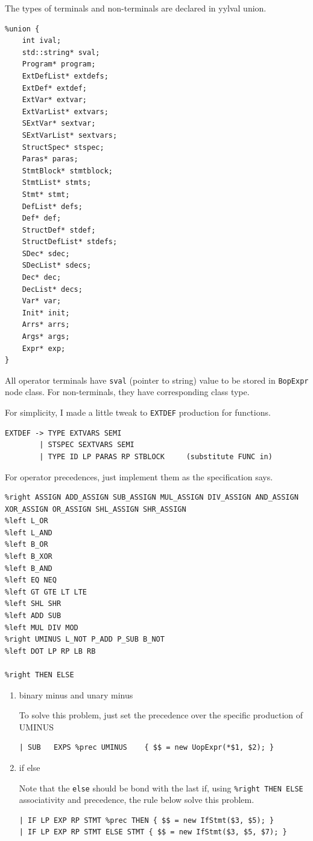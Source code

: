 \documentclass[11pt]{article}
\begin{document}
The types of terminals and non-terminals are declared in yylval union.
\begin{verbatim}
%union {
    int ival;
    std::string* sval;
    Program* program;
    ExtDefList* extdefs;
    ExtDef* extdef;
    ExtVar* extvar;
    ExtVarList* extvars;
    SExtVar* sextvar;
    SExtVarList* sextvars;
    StructSpec* stspec;
    Paras* paras;
    StmtBlock* stmtblock;
    StmtList* stmts;
    Stmt* stmt;
    DefList* defs;
    Def* def;
    StructDef* stdef;
    StructDefList* stdefs;
    SDec* sdec;
    SDecList* sdecs;
    Dec* dec;
    DecList* decs;
    Var* var;
    Init* init;
    Arrs* arrs;
    Args* args;
    Expr* exp;
}
\end{verbatim}

All operator terminals have \texttt{sval} (pointer to string) value to be stored in
\texttt{BopExpr} node class. For non-terminals, they have corresponding class type.

For simplicity, I made a little tweak to \texttt{EXTDEF} production for functions.
\begin{verbatim}
EXTDEF -> TYPE EXTVARS SEMI
        | STSPEC SEXTVARS SEMI
        | TYPE ID LP PARAS RP STBLOCK     (substitute FUNC in)
\end{verbatim}

For operator precedences, just implement them as the specification says.
\begin{verbatim}
%right ASSIGN ADD_ASSIGN SUB_ASSIGN MUL_ASSIGN DIV_ASSIGN AND_ASSIGN XOR_ASSIGN OR_ASSIGN SHL_ASSIGN SHR_ASSIGN
%left L_OR
%left L_AND
%left B_OR
%left B_XOR
%left B_AND
%left EQ NEQ
%left GT GTE LT LTE
%left SHL SHR
%left ADD SUB
%left MUL DIV MOD
%right UMINUS L_NOT P_ADD P_SUB B_NOT
%left DOT LP RP LB RB

%right THEN ELSE
\end{verbatim}
\begin{enumerate}
\item binary minus and unary minus

To solve this problem, just set the precedence over the specific production
of UMINUS
\begin{verbatim}
| SUB   EXPS %prec UMINUS    { $$ = new UopExpr(*$1, $2); }
\end{verbatim}

\item if else

Note that the \texttt{else} should be bond with the last if, using \texttt{\%right THEN
   ELSE} associativity and precedence, the rule below solve this problem.
\begin{verbatim}
| IF LP EXP RP STMT %prec THEN { $$ = new IfStmt($3, $5); }
| IF LP EXP RP STMT ELSE STMT { $$ = new IfStmt($3, $5, $7); }
\end{verbatim}
\end{enumerate}
\end{document}
